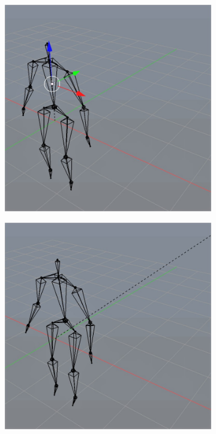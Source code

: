 \documentclass[10pt,twocolumn,letterpaper]{article}
\begin{document}
\begin{figure}[]
    \begin{subfigure}{0.2\textwidth}
        \centering
        \includegraphics[width=.9\linewidth]{linear-cannon-0.jpg}
    \end{subfigure}\begin{subfigure}{0.2\textwidth}
        \centering
        \includegraphics[width=.9\linewidth]{capped-cannon-5.jpg}
    \end{subfigure}\begin{subfigure}{0.2\textwidth}

\end{subfigure}
\end{figure}
\end{document}
